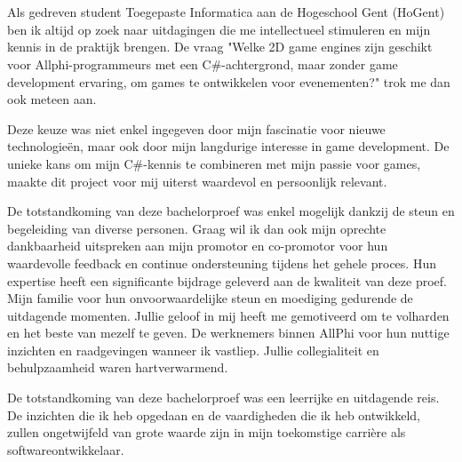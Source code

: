 
\chapter*{}%
\label{ch:voorwoord}


Als gedreven student Toegepaste Informatica aan de Hogeschool Gent (HoGent) ben ik altijd op zoek naar uitdagingen die me intellectueel stimuleren en mijn kennis in de praktijk brengen. De vraag "Welke 2D game engines zijn geschikt voor Allphi-programmeurs met een C#-achtergrond, maar zonder game development ervaring, om games te ontwikkelen voor evenementen?" trok me dan ook meteen aan.

Deze keuze was niet enkel ingegeven door mijn fascinatie voor nieuwe technologieën, maar ook door mijn langdurige interesse in game development. De unieke kans om mijn C#-kennis te combineren met mijn passie voor games, maakte dit project voor mij uiterst waardevol en persoonlijk relevant.

De totstandkoming van deze bachelorproef was enkel mogelijk dankzij de steun en begeleiding van diverse personen. Graag wil ik dan ook mijn oprechte dankbaarheid uitspreken aan mijn promotor en co-promotor voor hun waardevolle feedback en continue ondersteuning tijdens het gehele proces. Hun expertise heeft een significante bijdrage geleverd aan de kwaliteit van deze proef. Mijn familie voor hun onvoorwaardelijke steun en moediging gedurende de uitdagende momenten. Jullie geloof in mij heeft me gemotiveerd om te volharden en het beste van mezelf te geven. De werknemers binnen AllPhi voor hun nuttige inzichten en raadgevingen wanneer ik vastliep. Jullie collegialiteit en behulpzaamheid waren hartverwarmend.

De totstandkoming van deze bachelorproef was een leerrijke en uitdagende reis. De inzichten die ik heb opgedaan en de vaardigheden die ik heb ontwikkeld, zullen ongetwijfeld van grote waarde zijn in mijn toekomstige carrière als softwareontwikkelaar.
